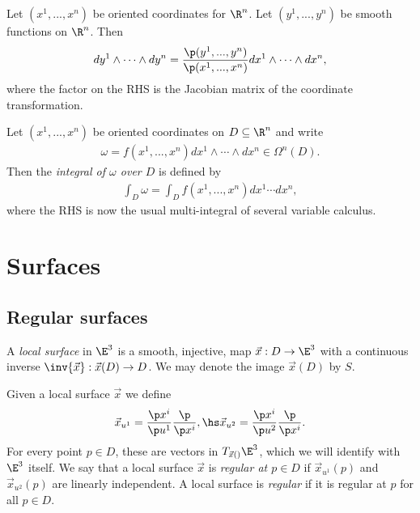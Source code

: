 \documentclass{article}
\begin{document}
\begin{proposition}
    Let $(x^1,...,x^n)$ be oriented coordinates for $\R^n$. Let $(y^1, ..., y^n)$ be 
    smooth functions on $\R^n$. Then
    \begin{align*}
        dy^1\wedge\cdots\wedge dy^n = \frac{\p(y^1,...,y^n)}{\p(x^1,...,x^n)}dx^1\wedge\cdots\wedge dx^n,
    \end{align*}
    where the factor on the RHS is the Jacobian matrix of the coordinate transformation.
\end{proposition}

\begin{definition}
    Let $(x^1,...,x^n)$ be oriented coordinates on $D\subseteq \R^n$ and write 
    \begin{align*}
        \omega = f(x^1, ..., x^n)dx^1\wedge\cdots\wedge dx^n\in\Omega^n(D).
    \end{align*}
    Then the \emph{integral of $\omega$ over $D$} is defined by
    \begin{align*}
        \int_D \omega = \int_D f(x^1,...,x^n)dx^1\cdots dx^n,
    \end{align*}
    where the RHS is now the usual multi-integral of several variable calculus.
\end{definition}

\section{Surfaces}

\subsection{Regular surfaces}

\begin{definition}
    A \emph{local surface} in $\E^3$ is a smooth, injective, map $\vec x: D\to\E^3$
    with a continuous inverse $\inv{\vec x} : \vec x(D) \to D$. We may denote the image
    $\vec x (D)$ by $S$.
\end{definition}

\begin{definition}
    Given a local surface $\vec x$ we define
    \begin{align*}
        \vec x_{u^1} = \frac{\p x^i}{\p u^1}\frac{\p}{\p x^i}, \hs 
        \vec x_{u^2} = \frac{\p x^i}{\p u^2}\frac{\p}{\p x^i}.
    \end{align*}
    For every point $p\in D$, these are vectors in $T_{\vec x()}\E^3$, which we will 
    identify with $\E^3$ itself. We say that a local surface $\vec x$ is \emph{regular
    at $p\in D$} if $\vec x_{u^1}(p)$ and $\vec x_{u^2}(p)$ are linearly independent.
    A local surface is \emph{regular} if it is regular at $p$ for all $p\in D$.
\end{definition}
\end{document}
